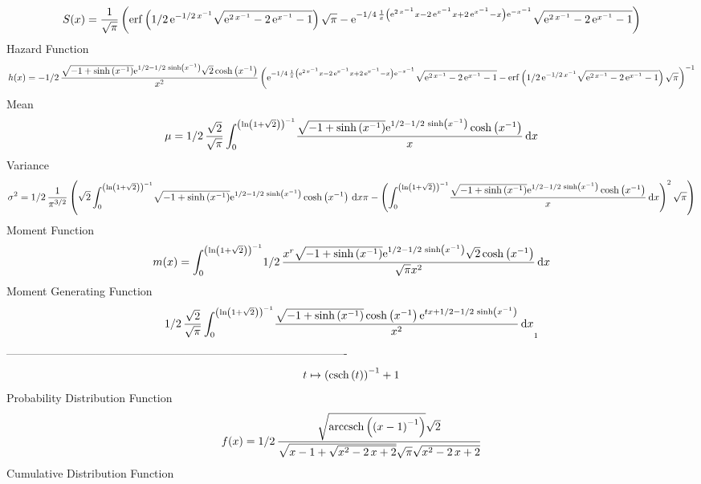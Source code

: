 \documentclass[12pt]{article}
\begin{document}
 $$ S(x)={\frac {1}{\sqrt {\pi}} \left( {\rm erf} \left(1/2\,{{\rm e}^{-1/2\,{x
}^{-1}}}\sqrt {{{\rm e}^{2\,{x}^{-1}}}-2\,{{\rm e}^{{x}^{-1}}}-1}
\right)\sqrt {\pi}-{{\rm e}^{-1/4\,{\frac {1}{x} \left( {{\rm e}^{2\,{
x}^{-1}}}x-2\,{{\rm e}^{{x}^{-1}}}x+2\,{{\rm e}^{{x}^{-1}}}-x \right) 
{{\rm e}^{-{x}^{-1}}}}}}\sqrt {{{\rm e}^{2\,{x}^{-1}}}-2\,{{\rm e}^{{x
}^{-1}}}-1} \right) }
$$ Hazard Function 
 $$ h(x)=-1/2\,{\frac {\sqrt {-1+\sinh \left( {x}^{-1} \right) }{{\rm e}^{1/2-1
/2\,\sinh \left( {x}^{-1} \right) }}\sqrt {2}\cosh \left( {x}^{-1}
 \right) }{{x}^{2}} \left( {{\rm e}^{-1/4\,{\frac {1}{x} \left( {
{\rm e}^{2\,{x}^{-1}}}x-2\,{{\rm e}^{{x}^{-1}}}x+2\,{{\rm e}^{{x}^{-1}
}}-x \right) {{\rm e}^{-{x}^{-1}}}}}}\sqrt {{{\rm e}^{2\,{x}^{-1}}}-2
\,{{\rm e}^{{x}^{-1}}}-1}-{\rm erf} \left(1/2\,{{\rm e}^{-1/2\,{x}^{-1
}}}\sqrt {{{\rm e}^{2\,{x}^{-1}}}-2\,{{\rm e}^{{x}^{-1}}}-1}\right)
\sqrt {\pi} \right) ^{-1}}
$$Mean 
 $$ \mu=1/2\,{\frac {\sqrt {2}}{\sqrt {\pi}}\int_{0}^{ \left( \ln  \left( 1+
\sqrt {2} \right)  \right) ^{-1}}\!{\frac {\sqrt {-1+\sinh \left( {x}^
{-1} \right) }{{\rm e}^{1/2-1/2\,\sinh \left( {x}^{-1} \right) }}\cosh
 \left( {x}^{-1} \right) }{x}}\,{\rm d}x}
$$ Variance 
 $$ \sigma^2 = 1/2\,{\frac {1}{{\pi}^{3/2}} \left( \sqrt {2}\int_{0}^{ \left( \ln 
 \left( 1+\sqrt {2} \right)  \right) ^{-1}}\!\sqrt {-1+\sinh \left( {x
}^{-1} \right) }{{\rm e}^{1/2-1/2\,\sinh \left( {x}^{-1} \right) }}
\cosh \left( {x}^{-1} \right) \,{\rm d}x\pi- \left( \int_{0}^{ \left( 
\ln  \left( 1+\sqrt {2} \right)  \right) ^{-1}}\!{\frac {\sqrt {-1+
\sinh \left( {x}^{-1} \right) }{{\rm e}^{1/2-1/2\,\sinh \left( {x}^{-1
} \right) }}\cosh \left( {x}^{-1} \right) }{x}}\,{\rm d}x \right) ^{2}
\sqrt {\pi} \right) }
$$Moment Function 
 $$ m(x) = \int_{0}^{ \left( \ln  \left( 1+\sqrt {2} \right)  \right) ^{-1}}\!1/2
\,{\frac {{x}^{r}\sqrt {-1+\sinh \left( {x}^{-1} \right) }{{\rm e}^{1/
2-1/2\,\sinh \left( {x}^{-1} \right) }}\sqrt {2}\cosh \left( {x}^{-1}
 \right) }{\sqrt {\pi}{x}^{2}}}\,{\rm d}x
$$ Moment Generating Function 
 $$1/2\,{\frac {\sqrt {2}}{\sqrt {\pi}}\int_{0}^{ \left( \ln  \left( 1+
\sqrt {2} \right)  \right) ^{-1}}\!{\frac {\sqrt {-1+\sinh \left( {x}^
{-1} \right) }\cosh \left( {x}^{-1} \right) {{\rm e}^{tx+1/2-1/2\,
\sinh \left( {x}^{-1} \right) }}}{{x}^{2}}}\,{\rm d}x}_{{1}}
$$-------------------------------------------------------------------------------------------  \\$$t\mapsto  \left( {\rm csch} \left(t\right) \right) ^{-1}+1
$$Probability Distribution Function 
$$  f(x)=1/2\,{\frac {\sqrt {{\rm arccsch} \left( \left( x-1 \right) ^{-1}
\right)}\sqrt {2}}{\sqrt {x-1+\sqrt {{x}^{2}-2\,x+2}}\sqrt {\pi}\sqrt 
{{x}^{2}-2\,x+2}}}
$$Cumulative Distribution Function  
\end{document}
